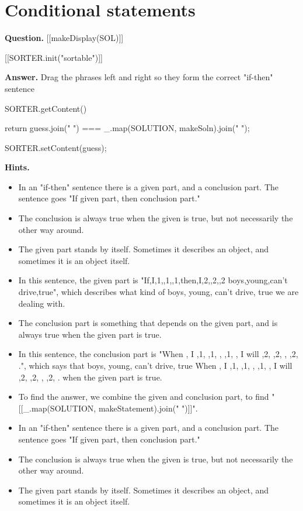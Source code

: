 \documentclass{article}
\begin{document}
\section*{Conditional statements}
\textbf{Question.} [[makeDisplay(SOL)]]
            
        
        [[SORTER.init("sortable")]]

\textbf{Answer.} Drag the phrases left and right so they form the correct "if-then" sentence
        
        SORTER.getContent()
        
            return guess.join(" ") === \_.map(SOLUTION, makeSoln).join(" ");
        
        
            SORTER.setContent(guess);

\textbf{Hints.}
\begin{itemize}
  \item In an "if-then" sentence there is a given part, and a conclusion part. The sentence goes "If given part, then conclusion part."
  \item The conclusion is always true when the given is true, but not necessarily the other way around.
  \item The given part stands by itself. Sometimes it describes an object, and sometimes it is an object itself.
  \item In this sentence, the given part is "If,I,1,,1,,1,then,I,2,,2,,2 boys,young,can't drive,true", which describes what kind of boys, young, can't drive, true we are dealing with.
  \item The conclusion part is something that depends on the given part, and is always true when the given part is true.
  \item In this sentence, the conclusion part is "When , I ,1, ,1,  , ,1, , I will ,2, ,2,  , ,2, .", which says that boys, young, can't drive, true When , I ,1, ,1,  , ,1, , I will ,2, ,2,  , ,2, . when the given part is true.
  \item To find the answer, we combine the given and conclusion part, to find "[[\_.map(SOLUTION, makeStatement).join(" ")]]".
  \item In an "if-then" sentence there is a given part, and a conclusion part. The sentence goes "If given part, then conclusion part."
  \item The conclusion is always true when the given is true, but not necessarily the other way around.
  \item The given part stands by itself. Sometimes it describes an object, and sometimes it is an object itself.

\end{itemize}
\end{document}

